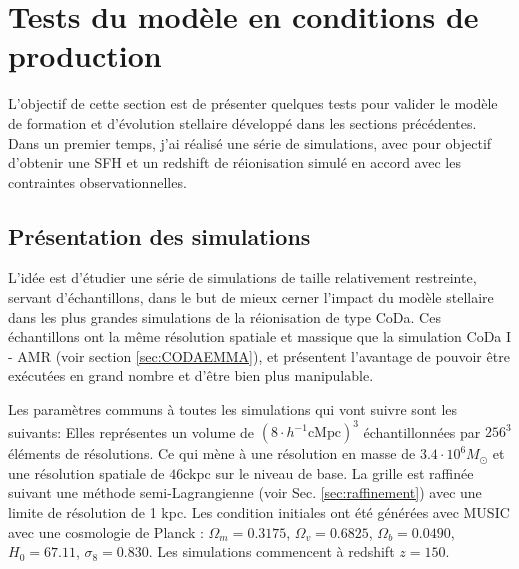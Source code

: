 \clearpage
\section{Tests du modèle en conditions de production}

L'objectif de cette section est de présenter quelques tests pour valider le modèle de formation et d'évolution stellaire développé dans les sections précédentes.
Dans un premier temps, j'ai réalisé une série de simulations, avec pour objectif d'obtenir une \ac{SFH} et un redshift de réionisation simulé en accord avec les contraintes observationnelles.

\subsection{Présentation des simulations}
\label{sec:pres_simu}

L'idée est d'étudier une série de simulations de taille relativement restreinte, servant d'échantillons, dans le but de mieux cerner l'impact du modèle stellaire dans les plus grandes simulations de la réionisation de type CoDa.
Ces échantillons ont la même résolution spatiale et massique que la simulation CoDa I - AMR (voir section \ref{sec:CODAEMMA}), et présentent l'avantage de pouvoir être exécutées en grand nombre et d'être bien plus manipulable.

Les paramètres communs à toutes les simulations qui vont suivre sont les suivants:
Elles représentes un volume de $\left( 8\cdot h^{-1} \mathrm{cMpc} \right)^3$ échantillonnées par $256^3$ éléments de résolutions. %
Ce qui mène à une résolution en masse de $3.4 \cdot 10^6 M_\odot$ et une résolution spatiale de $46$ckpc sur le niveau de base.
La grille est raffinée suivant une méthode semi-Lagrangienne (voir Sec. \ref{sec:raffinement}) avec une limite de résolution de 1 kpc.
Les condition initiales ont été générées avec MUSIC \citep{hahn_multi-scale_2011} avec une cosmologie de Planck \citep{planck_collaboration_planck_2016} : 
$\Omega_m=0.3175$, 
$\Omega_v=0.6825$,
$\Omega_b=0.0490$,
$H_0=67.11$,
$\sigma_8=0.830$. 
Les simulations commencent à redshift $z=150$.

